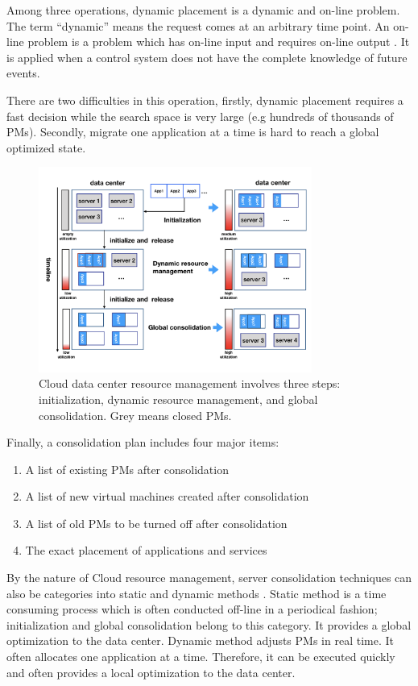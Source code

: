 \begin{enumerate}
	Among three operations, dynamic placement is a dynamic and on-line problem.
	The term ``dynamic'' means the request comes at an arbitrary time point. An on-line problem is a problem which has on-line input and requires on-line output \cite{Borodin:uQcy_H6C}. It is applied when a control system does not have the complete knowledge of future events.

	There are two difficulties in this operation, firstly, dynamic placement requires a fast decision while the search space is very large (e.g hundreds of thousands of PMs). Secondly, migrate one application at a time is hard to reach a global optimized state.

\end{enumerate}

\begin{figure}
	\centering
	\includegraphics[width=0.8\textwidth]{pics/resource_management.png}
	\caption{Cloud data center resource management involves three steps: initialization, dynamic resource management, and global consolidation. Grey means closed PMs.}
	\label{fig:management}
\end{figure} 

Finally, a consolidation plan includes four major items:
			\begin{enumerate}
				\item A list of existing PMs after consolidation
				\item A list of new virtual machines created after consolidation
				\item A list of old PMs to be turned off after consolidation
				\item The exact placement of applications and services
			\end{enumerate}

By the nature of Cloud resource management, server consolidation techniques can also be categories into static and dynamic methods \cite{Xiao:2015ik, Verma:2009wi}. Static method is a time consuming process which is often conducted off-line in a periodical fashion; initialization and global consolidation belong to this category. It provides a global optimization to the data center. Dynamic method adjusts PMs in real time. It often allocates one application at a time. Therefore, it can be executed quickly and often provides a local optimization to the data center.

